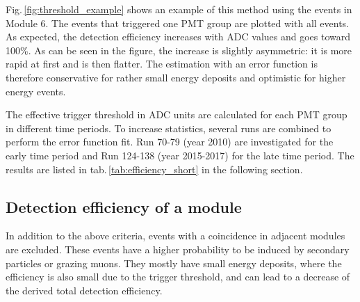 Fig.\,\ref{fig:threshold_example} shows an example of this method using the events in Module 6. The events that triggered one PMT group are plotted with all events. As expected, the detection efficiency increases with ADC values and goes toward 100\%. As can be seen in the figure, the increase is slightly asymmetric: it is more rapid at first and is then flatter. The estimation with an error function is therefore conservative for rather small energy deposits and optimistic for higher energy events.

The effective trigger threshold in ADC units are calculated for each PMT group in different time periods. To increase statistics, several runs are combined to perform the error function fit. Run 70-79 (year 2010) are investigated for the early time period and Run 124-138 (year 2015-2017) for the late time period. The results are listed in tab.\,\ref{tab:efficiency_short} in the following section.


\subsection{Detection efficiency of a module}
In addition to the above criteria, events with a coincidence in adjacent modules are excluded. These events have a higher probability to be induced by secondary particles or grazing muons. They mostly have small energy deposits, where the efficiency is also small due to the trigger threshold, and can lead to a decrease of the derived total detection efficiency.

